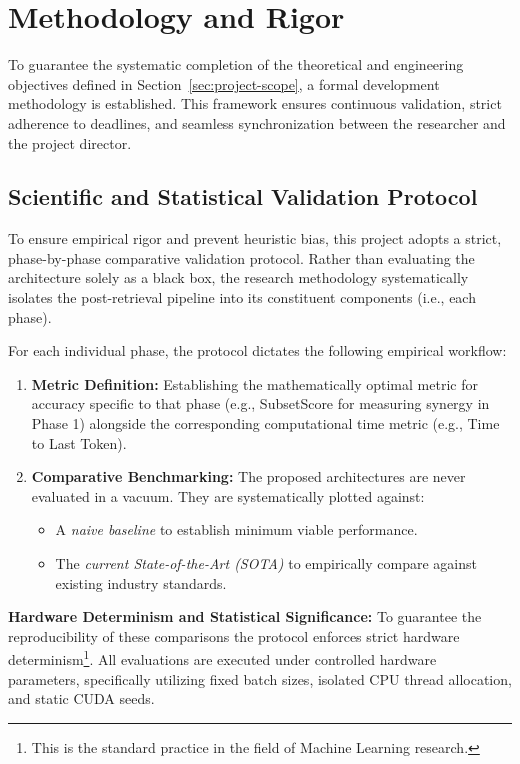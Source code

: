 \section{Methodology and Rigor}
\label{sec:methodology-and-rigor}

To guarantee the systematic completion of the theoretical and engineering objectives defined in Section~\ref{sec:project-scope}, a formal development methodology is established. This framework ensures continuous validation, strict adherence to deadlines, and seamless synchronization between the researcher and the project director.

\subsection{Scientific and Statistical Validation Protocol}
\label{subsec:validation-protocol}

To ensure empirical rigor and prevent heuristic bias, this project adopts a strict, phase-by-phase comparative validation protocol. Rather than evaluating the architecture solely as a black box, the research methodology systematically isolates the post-retrieval pipeline into its constituent components (i.e., each phase).

For each individual phase, the protocol dictates the following empirical workflow:
\begin{enumerate}
    \item \textbf{Metric Definition:} Establishing the mathematically optimal metric for accuracy specific to that phase (e.g., SubsetScore for measuring synergy in Phase 1) alongside the corresponding computational time metric (e.g., Time to Last Token).
    \item \textbf{Comparative Benchmarking:} The proposed architectures  are never evaluated in a vacuum. They are systematically plotted against:
    \begin{itemize}
        \item A \textit{naive baseline} to establish minimum viable performance.
        \item The \textit{current State-of-the-Art (SOTA)} to empirically compare against existing industry standards.
    \end{itemize}
\end{enumerate}

\textbf{Hardware Determinism and Statistical Significance:}
To guarantee the reproducibility of these comparisons the protocol enforces strict hardware determinism\footnote{This is the standard practice in the field of Machine Learning research\cite{determinism2018}.}. All evaluations are executed under controlled hardware parameters, specifically utilizing fixed batch sizes, isolated CPU thread allocation, and static CUDA seeds.

